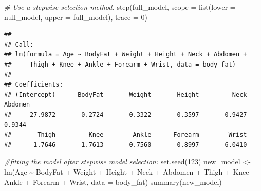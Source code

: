 \documentclass[
]{article}
\newenvironment{Shaded}{\begin{snugshade}}{\end{snugshade}}
\newcommand{\AttributeTok}[1]{\textcolor[rgb]{0.77,0.63,0.00}{#1}}
\newcommand{\CommentTok}[1]{\textcolor[rgb]{0.56,0.35,0.01}{\textit{#1}}}
\newcommand{\DecValTok}[1]{\textcolor[rgb]{0.00,0.00,0.81}{#1}}
\newcommand{\FunctionTok}[1]{\textcolor[rgb]{0.00,0.00,0.00}{#1}}
\newcommand{\NormalTok}[1]{#1}
\newcommand{\OtherTok}[1]{\textcolor[rgb]{0.56,0.35,0.01}{#1}}
\newcommand{\SpecialCharTok}[1]{\textcolor[rgb]{0.00,0.00,0.00}{#1}}
\begin{document}
\begin{Shaded}
\begin{Highlighting}[]
\CommentTok{\# Use a stepwise selection method.}
\FunctionTok{step}\NormalTok{(full\_model, }\AttributeTok{scope =} \FunctionTok{list}\NormalTok{(}\AttributeTok{lower =}\NormalTok{ null\_model, }\AttributeTok{upper =}\NormalTok{ full\_model), }\AttributeTok{trace =} \DecValTok{0}\NormalTok{)}
\end{Highlighting}
\end{Shaded}

\begin{verbatim}
## 
## Call:
## lm(formula = Age ~ BodyFat + Weight + Height + Neck + Abdomen + 
##     Thigh + Knee + Ankle + Forearm + Wrist, data = body_fat)
## 
## Coefficients:
## (Intercept)      BodyFat       Weight       Height         Neck      Abdomen  
##    -27.9872       0.2724      -0.3322      -0.3597       0.9427       0.9344  
##       Thigh         Knee        Ankle      Forearm        Wrist  
##     -1.7646       1.7613      -0.7560      -0.8997       6.0410
\end{verbatim}

\begin{Shaded}
\begin{Highlighting}[]
\CommentTok{\#fitting the model after stepwise model selection:}
\FunctionTok{set.seed}\NormalTok{(}\DecValTok{123}\NormalTok{)}
\NormalTok{new\_model }\OtherTok{\textless{}{-}} \FunctionTok{lm}\NormalTok{(Age }\SpecialCharTok{\textasciitilde{}}\NormalTok{ BodyFat }\SpecialCharTok{+}\NormalTok{ Weight }\SpecialCharTok{+}\NormalTok{ Height }\SpecialCharTok{+}\NormalTok{ Neck }\SpecialCharTok{+}\NormalTok{ Abdomen }\SpecialCharTok{+}\NormalTok{ Thigh }\SpecialCharTok{+}\NormalTok{ Knee }\SpecialCharTok{+}\NormalTok{ Ankle }\SpecialCharTok{+} 
\NormalTok{                  Forearm }\SpecialCharTok{+}\NormalTok{ Wrist, }\AttributeTok{data =}\NormalTok{ body\_fat)}
\FunctionTok{summary}\NormalTok{(new\_model)}
\end{Highlighting}
\end{Shaded}
\end{document}

